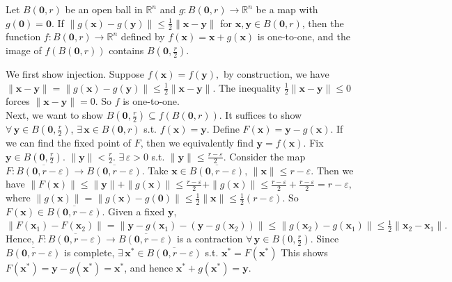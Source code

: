 \begin{lemma}
Let $B(\mathbf{0},r)$ be an open ball in $\mathbb{R}^n$ and $g: B(\mathbf{0},r) \to \mathbb{R}^n$ be a map with $g(\mathbf{0}) = \mathbf{0}$. 
If $\|g(\mathbf{x}) - g(\mathbf{y})\| \le \frac{1}{2}\|\mathbf{x} - \mathbf{y}\|$ for $\mathbf{x}, \mathbf{y} \in B(\mathbf{0},r)$, then the function $f: B(\mathbf{0},r) \to \mathbb{R}^n$ defined by $f(\mathbf{x}) = \mathbf{x} + g(\mathbf{x})$ is one-to-one, and the image of $f(B(\mathbf{0},r))$ contains $B(\mathbf{0}, \frac{r}{2})$.
\label{lemma_for_inverse_funct_thm}
\end{lemma}

\begin{pfbox}

We first show injection. Suppose $f(\mathbf{x}) = f(\mathbf{y}),$ by construction, we have $\|\mathbf{x} - \mathbf{y}\| = \|g(\mathbf{x}) - g(\mathbf{y})\| \le \frac{1}{2}\|\mathbf{x} - \mathbf{y}\|.$
The inequality $\frac{1}{2}\|\mathbf{x} - \mathbf{y}\| \le 0$ forces $\|\mathbf{x} - \mathbf{y}\| = 0$. So $f$ is one-to-one.\\
Next, we want to show $B(\mathbf{0}, \frac{r}{2}) \subseteq f(B(\mathbf{0},r))$. It suffices to show $\forall\,\mathbf{y} \in B(\mathbf{0}, \frac{r}{2})$, $\exists\,\mathbf{x} \in B(\mathbf{0},r)$ s.t.
$f(\mathbf{x}) = \mathbf{y}.$ Define $F(\mathbf{x}) = \mathbf{y} - g(\mathbf{x})$. If we can find the fixed point of $F$, then we equivalently find $\mathbf{y} = f(\mathbf{x})$.
Fix $\mathbf{y} \in B(\mathbf{0}, \frac{r}{2})$. $\|\mathbf{y}\| < \frac{r}{2}$. $\exists\,\varepsilon > 0$ s.t. $\|\mathbf{y}\| \le \frac{r-\varepsilon}{2}$.
Consider the map $F: \overline{B(\mathbf{0}, r-\varepsilon)} \to \overline{B(\mathbf{0}, r-\varepsilon)}.$ Take $\mathbf{x} \in \overline{B(\mathbf{0}, r-\varepsilon)}, \,\|\mathbf{x}\| \le r - \varepsilon$. 
Then we have $\|F(\mathbf{x})\| \le \|\mathbf{y}\| + \|g(\mathbf{x})\| \le \frac{r-\varepsilon}{2} + \|g(\mathbf{x})\| \le \frac{r-\varepsilon}{2} + \frac{r-\varepsilon}{2} = r-\varepsilon,$
where $\|g(\mathbf{x})\| = \|g(\mathbf{x}) - g(\mathbf{0})\| \le \frac{1}{2}\|\mathbf{x}\| \le \frac{1}{2}(r-\varepsilon)$. So $F(\mathbf{x}) \in \overline{B(\mathbf{0}, r-\varepsilon)}$.
Given a fixed $\mathbf{y}$,
$\|F(\mathbf{x}_1) - F(\mathbf{x}_2)\| = \|\mathbf{y} - g(\mathbf{x}_1) - (\mathbf{y} - g(\mathbf{x}_2))\| \le \|g(\mathbf{x}_2) - g(\mathbf{x}_1)\| \le \frac{1}{2}\|\mathbf{x}_2 - \mathbf{x}_1\|.$ Hence, $F: \overline{B(\mathbf{0}, r-\varepsilon)} \to \overline{B(\mathbf{0}, r-\varepsilon)}$ is a contraction $\forall\,\mathbf{y} \in B(0, \frac{r}{2})$. 
Since $\overline{B(\mathbf{0}, r-\varepsilon)}$ is complete, $\exists\,\mathbf{x}^* \in \overline{B(\mathbf{0}, r-\varepsilon)}$ s.t. $\mathbf{x}^* = F(\mathbf{x}^*)$
This shows $F(\mathbf{x}^*) = \mathbf{y} - g(\mathbf{x}^*) = \mathbf{x}^*$, and hence $\mathbf{x}^* + g(\mathbf{x}^*) = \mathbf{y}.$

\end{pfbox}



